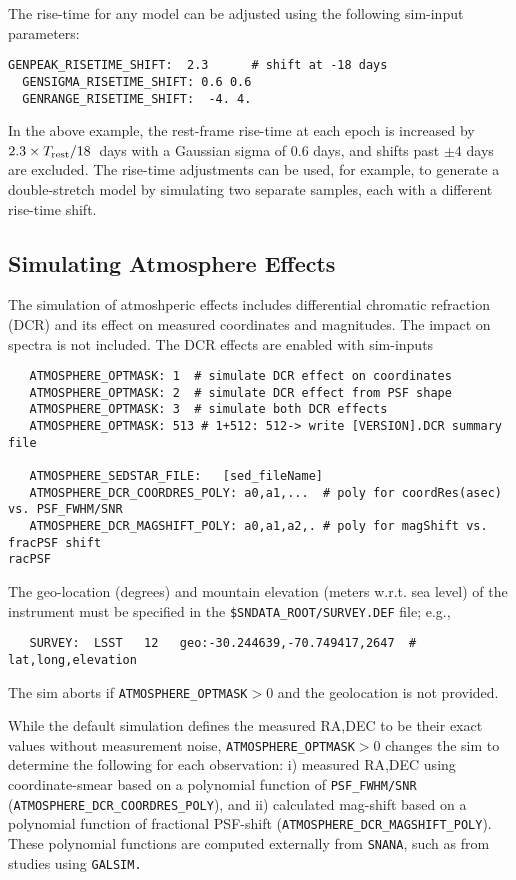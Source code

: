 \documentclass[12pt]{article}
\newcommand{\Trest}{T_{\rm rest}}
\newcommand{\snana}{{\tt SNANA}}
\begin{document}
The rise-time for any model can be adjusted using 
the following sim-input parameters:
\begin{Verbatim}[frame=single]
  GENPEAK_RISETIME_SHIFT:  2.3      # shift at -18 days
  GENSIGMA_RISETIME_SHIFT: 0.6 0.6
  GENRANGE_RISETIME_SHIFT:  -4. 4.
\end{Verbatim}
%
In the above example, the rest-frame rise-time at each epoch
is increased by $2.3\times \Trest/18$~days
with a Gaussian sigma of 0.6 days,
and shifts past $\pm 4$ days are excluded.
The rise-time adjustments can be used, for example, 
to generate a double-stretch model by simulating 
two separate samples, each with a different 
rise-time shift.



\clearpage
\subsection{Simulating Atmosphere Effects}
\label{subsec:simAtmos}


The simulation of atmoshperic effects includes 
differential chromatic refraction (DCR)
and its effect on measured coordinates and magnitudes. The impact on spectra
is not included. The DCR effects are enabled with sim-inputs
 \begin{verbatim}
   ATMOSPHERE_OPTMASK: 1  # simulate DCR effect on coordinates
   ATMOSPHERE_OPTMASK: 2  # simulate DCR effect from PSF shape
   ATMOSPHERE_OPTMASK: 3  # simulate both DCR effects
   ATMOSPHERE_OPTMASK: 513 # 1+512: 512-> write [VERSION].DCR summary file

   ATMOSPHERE_SEDSTAR_FILE:   [sed_fileName]
   ATMOSPHERE_DCR_COORDRES_POLY: a0,a1,...  # poly for coordRes(asec) vs. PSF_FWHM/SNR
   ATMOSPHERE_DCR_MAGSHIFT_POLY: a0,a1,a2,. # poly for magShift vs. fracPSF shift
racPSF
\end{verbatim}
%
The geo-location (degrees) and mountain elevation (meters w.r.t. sea level) 
of the instrument must be specified 
in the {\tt \$SNDATA\_ROOT/SURVEY.DEF} file; e.g., 
\begin{verbatim}
   SURVEY:  LSST   12   geo:-30.244639,-70.749417,2647  # lat,long,elevation
\end{verbatim}
The sim aborts if {\tt ATMOSPHERE\_OPTMASK}$>0$ 
and the geolocation is not provided.


While the default simulation defines the measured RA,DEC to be their exact values
without measurement noise, {\tt ATMOSPHERE\_OPTMASK}$>0$ changes the sim
to determine the following for each observation:
i) measured RA,DEC using coordinate-smear based on a polynomial function of 
{\tt PSF\_FWHM/SNR} ({\tt ATMOSPHERE\_DCR\_COORDRES\_POLY}),  and 
ii) calculated mag-shift based on a polynomial function of fractional PSF-shift
({\tt ATMOSPHERE\_DCR\_MAGSHIFT\_POLY}).
These polynomial functions are computed externally from \snana,
such as from studies using {\tt GALSIM.}
\end{document}

